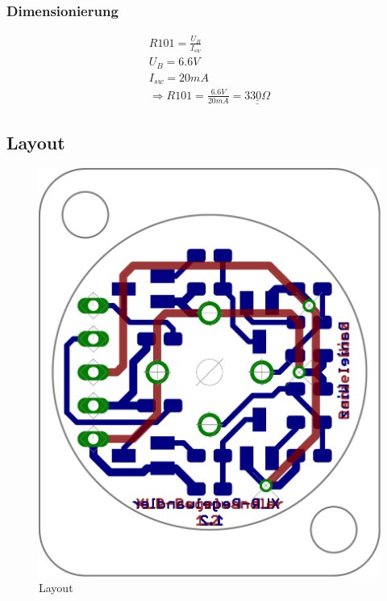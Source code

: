 \subsubsection{Dimensionierung}
\[ \begin{array}{l} R101 = \frac{U_B}{I_{sw}}\\
U_B = 6.6 V\\
I_{sw} = 20 mA\\
\Rightarrow R101 = \frac{6.6V}{20mA} = \underline{\underline{330 \Omega}}
\end{array} \]

\subsection{Layout}
\begin{figure}[h!]
	\centering
	\includegraphics[scale=\layscale]{fig/xlr_pegelwandler_v_1_2_lay_transp.pdf}
	\caption{Layout}
	\label{lay:pegw}
\end{figure}
